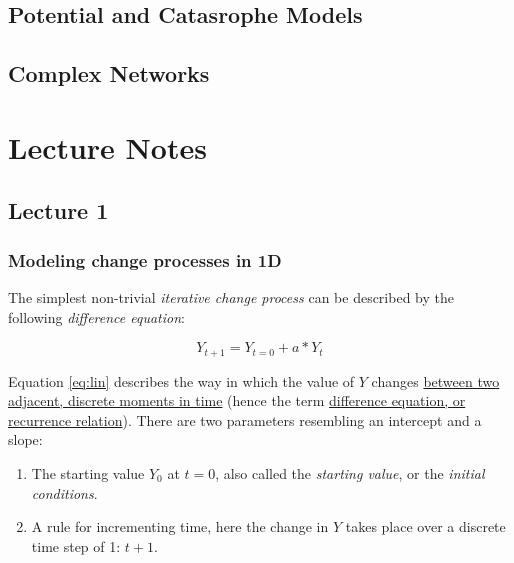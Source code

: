 \documentclass[]{book}
\providecommand{\tightlist}{%
  \setlength{\itemsep}{0pt}\setlength{\parskip}{0pt}}
\let\stdsection\section
\renewcommand\section{\newpage\stdsection}
\begin{document}
\chapter{Potential and Catasrophe Models}\label{cusp}

\chapter{Complex Networks}\label{nets}

\part{Lecture Notes}\label{part-lecture-notes}

\chapter*{Lecture 1}\label{lecture-1}

\section*{Modeling change processes in
1D}\label{modeling-change-processes-in-1d}

The simplest non-trivial \emph{iterative change process} can be
described by the following \emph{difference equation}:

\begin{equation}
Y_{t+1} = Y_{t=0} + a*Y_t
\label{eq:lin}
\end{equation}

Equation \eqref{eq:lin} describes the way in which the value of \(Y\)
changes
\href{https://en.wikipedia.org/wiki/Discrete_time_and_continuous_time}{between
two adjacent, discrete moments in time} (hence the term
\href{https://en.wikipedia.org/wiki/Recurrence_relation}{difference
equation, or recurrence relation}). There are two parameters resembling
an intercept and a slope:

\begin{enumerate}
\def\labelenumi{\arabic{enumi}.}
\tightlist
\item
  The starting value \(Y_0\) at \(t=0\), also called the \emph{starting
  value}, or the \emph{initial conditions}.
\item
  A rule for incrementing time, here the change in \(Y\) takes place
  over a discrete time step of 1: \(t+1\).
\end{enumerate}
\end{document}
